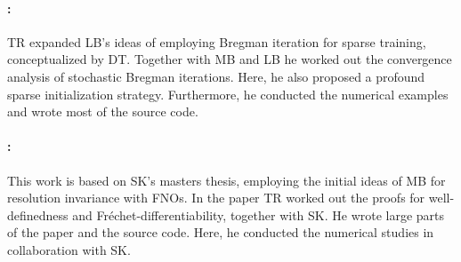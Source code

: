 \paragraph{\cite{bungert2022bregman}:} TR expanded LB's ideas of employing Bregman iteration for sparse training, conceptualized by DT. Together with MB and LB he worked out the convergence analysis of stochastic Bregman iterations. Here, he also proposed a profound sparse initialization strategy. Furthermore, he conducted the numerical examples and wrote most of the source code.

\paragraph{\cite{kabri2023resolution}:} This work is based on SK's masters thesis, employing the initial ideas of MB for resolution invariance with FNOs. In the paper TR worked out the proofs for well-definedness and Fréchet-differentiability, together with SK. He wrote large parts of the paper and the source code. Here, he conducted the numerical studies in collaboration with SK.

